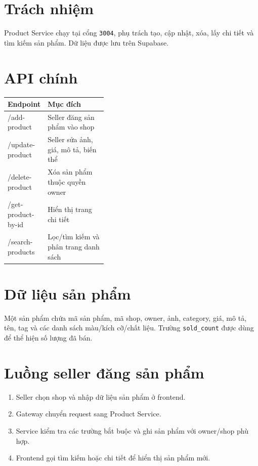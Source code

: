 \documentclass[12pt]{article}
\begin{document}

\section{Trách nhiệm}
Product Service chạy tại cổng \texttt{3004}, phụ trách tạo, cập nhật, xóa, lấy chi tiết và tìm kiếm sản phẩm. Dữ liệu được lưu trên Supabase.

\section{API chính}
\begin{tabularx}{\linewidth}{>{\ttfamily}p{0.39\linewidth} X}
\toprule
Endpoint & Mục đích \\
\midrule
/add-product & Seller đăng sản phẩm vào shop \\
/update-product & Seller sửa ảnh, giá, mô tả, biến thể \\
/delete-product & Xóa sản phẩm thuộc quyền owner \\
/get-product-by-id & Hiển thị trang chi tiết \\
/search-products & Lọc/tìm kiếm và phân trang danh sách \\
\bottomrule
\end{tabularx}

\section{Dữ liệu sản phẩm}
Một sản phẩm chứa mã sản phẩm, mã shop, owner, ảnh, category, giá, mô tả, tên, tag và các danh sách màu/kích cỡ/chất liệu. Trường \texttt{sold\_count} được dùng để thể hiện số lượng đã bán.

\section{Luồng seller đăng sản phẩm}
\begin{enumerate}
  \item Seller chọn shop và nhập dữ liệu sản phẩm ở frontend.
  \item Gateway chuyển request sang Product Service.
  \item Service kiểm tra các trường bắt buộc và ghi sản phẩm với owner/shop phù hợp.
  \item Frontend gọi tìm kiếm hoặc chi tiết để hiển thị sản phẩm mới.
\end{enumerate}
\end{document}
